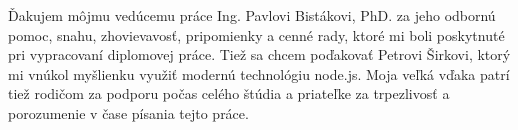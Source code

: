 Ďakujem môjmu vedúcemu práce Ing. Pavlovi Bistákovi, PhD. za jeho odbornú pomoc, snahu, zhovievavosť, pripomienky a cenné rady, ktoré mi boli poskytnuté pri vypracovaní diplomovej práce. Tiež sa chcem poďakovať Petrovi Širkovi, ktorý mi vnúkol myšlienku využiť modernú technológiu node.js. Moja veľká vďaka patrí tiež rodičom za podporu počas celého štúdia a priateľke za trpezlivosť a porozumenie v čase písania tejto práce.